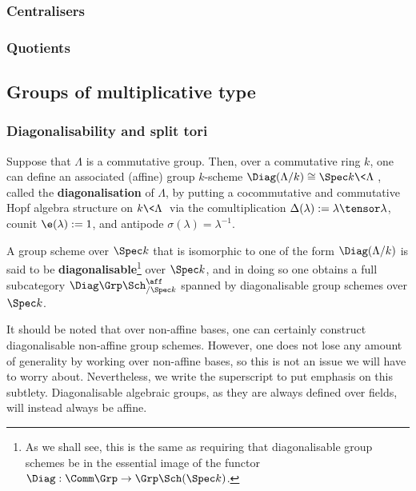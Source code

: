         \subsubsection{Centralisers}
        
        \subsubsection{Quotients}
        
    \subsection{Groups of multiplicative type}
        \subsubsection{Diagonalisability and split tori}
            \begin{definition} \label{def: diagonalisable_group_schemes}
                Suppose that $\Lambda$ is a commutative group. Then, over a commutative ring $k$, one can define an associated (affine) group $k$-scheme $\Diag(\Lambda/k) \cong \Spec k\<\Lambda\>$, called the \textbf{diagonalisation} of $\Lambda$, by putting a cocommutative and commutative Hopf algebra structure on $k\<\Lambda\>$ via the comultiplication $\Delta(\lambda) := \lambda \tensor \lambda$, counit $\e(\lambda) := 1$, and antipode $\sigma(\lambda) = \lambda^{-1}$.
                
                A group scheme over $\Spec k$ that is isomorphic to one of the form $\Diag(\Lambda/k)$ is said to be \textbf{diagonalisable}\footnote{As we shall see, this is the same as requiring that diagonalisable group schemes be in the essential image of the functor $\Diag: \Comm\Grp \to \Grp\Sch(\Spec k)$.} over $\Spec k$, and in doing so one obtains a full subcategory $\Diag\Grp\Sch^{\aff}_{/\Spec k}$ spanned by diagonalisable group schemes over $\Spec k$.
            \end{definition}
            \begin{remark}
                It should be noted that over non-affine bases, one can certainly construct diagonalisable non-affine group schemes. However, one does not lose any amount of generality by working over non-affine bases, so this is not an issue we will have to worry about. Nevertheless, we write the \say{$\aff$} superscript to put emphasis on this subtlety. Diagonalisable algebraic groups, as they are always defined over fields, will instead always be affine.
            \end{remark}
